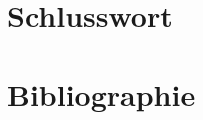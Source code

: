 \documentclass[10pt,a4paper,oneside]{99_fhnwreport}
\begin{document}
\begin{otherlanguage}{ngerman}
\section{Schlusswort}\label{sec:schlusswort}

\clearpage

\section{Bibliographie}\label{sec:bibliographie}

\clearpage

\begin{appendix}

\end{appendix}
\end{otherlanguage}
\end{document}
